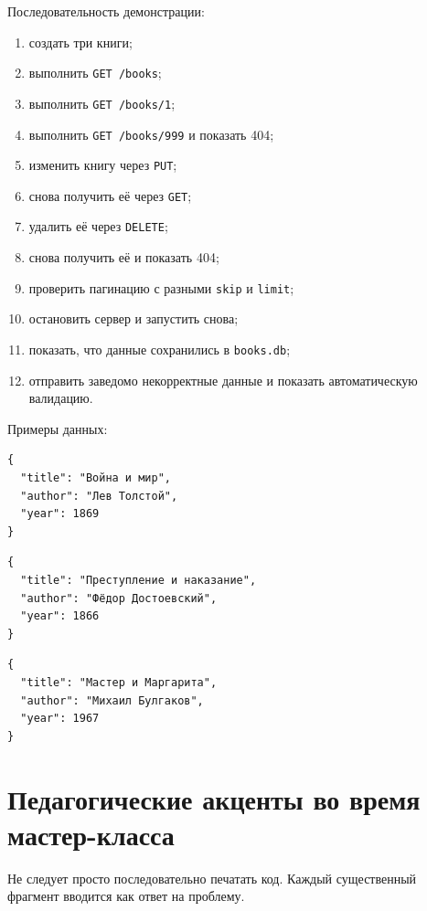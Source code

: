 \documentclass[12pt,a4paper]{article}
\begin{document}
Последовательность демонстрации:
\begin{enumerate}
    \item создать три книги;
    \item выполнить \texttt{GET /books};
    \item выполнить \texttt{GET /books/1};
    \item выполнить \texttt{GET /books/999} и показать 404;
    \item изменить книгу через \texttt{PUT};
    \item снова получить её через \texttt{GET};
    \item удалить её через \texttt{DELETE};
    \item снова получить её и показать 404;
    \item проверить пагинацию с разными \texttt{skip} и \texttt{limit};
    \item остановить сервер и запустить снова;
    \item показать, что данные сохранились в \texttt{books.db};
    \item отправить заведомо некорректные данные и показать автоматическую валидацию.
\end{enumerate}

Примеры данных:
\begin{lstlisting}
{
  "title": "Война и мир",
  "author": "Лев Толстой",
  "year": 1869
}
\end{lstlisting}
\begin{lstlisting}
{
  "title": "Преступление и наказание",
  "author": "Фёдор Достоевский",
  "year": 1866
}
\end{lstlisting}
\begin{lstlisting}
{
  "title": "Мастер и Маргарита",
  "author": "Михаил Булгаков",
  "year": 1967
}
\end{lstlisting}

\section{Педагогические акценты во время мастер-класса}
Не следует просто последовательно печатать код. Каждый существенный фрагмент вводится как ответ на проблему.
\end{document}

